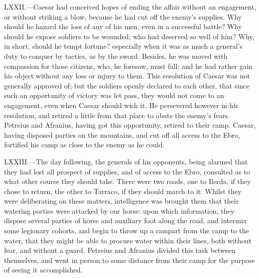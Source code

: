 LXXII.—Caesar had conceived hopes of ending the affair without an
engagement, or without striking a blow, because he had cut off the
enemy's supplies. Why should he hazard the loss of any of his men, even
in a successful battle? Why should he expose soldiers to be wounded; who
had deserved so well of him? Why, in short, should he tempt fortune?
especially when it was as much a general's duty to conquer by tactics,
as by the sword. Besides, he was moved with compassion for those
citizens, who, he foresaw, must fall: and he had rather gain his object
without any loss or injury to them. This resolution of Caesar was not
generally approved of; but the soldiers openly declared to each other,
that since such an opportunity of victory was let pass, they would not
come to an engagement, even when Caesar should wish it. He persevered
however in his resolution, and retired a little from that place to abate
the enemy's fears. Petreius and Afranius, having got this opportunity,
retired to their camp. Caesar, having disposed parties on the mountains,
and cut off all access to the Ebro, fortified his camp as close to the
enemy as he could.

LXXIII.—The day following, the generals of his opponents, being alarmed
that they had lost all prospect of supplies, and of access to the Ebro,
consulted as to what other course they should take. There were two
roads, one to Ilerda, if they chose to return, the other to Tarraco, if
they should march to it. Whilst they were deliberating on these matters,
intelligence was brought them that their watering parties were attacked
by our horse: upon which information, they dispose several parties of
horse and auxiliary foot along the road, and intermix some legionary
cohorts, and begin to throw up a rampart from the camp to the water,
that they might be able to procure water within their lines, both
without fear, and without a guard. Petreius and Afranius divided this
task between themselves, and went in person to some distance from their
camp for the purpose of seeing it accomplished.

